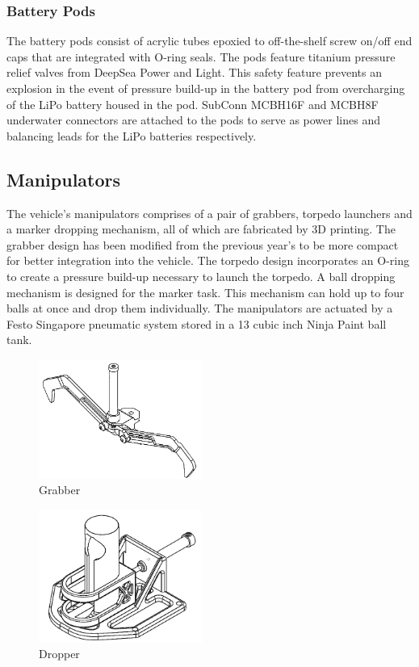 \documentclass[journal,12pt]{IEEEtran}
\begin{document}
\subsubsection{Battery Pods}
The battery pods consist of acrylic tubes epoxied to off-the-shelf screw on/off end caps that are integrated with O-ring seals. The pods feature titanium pressure relief valves from DeepSea Power and Light. This safety feature prevents an explosion in the event of pressure build-up in the battery pod from overcharging of the LiPo battery housed in the pod. SubConn MCBH16F and MCBH8F underwater connectors are attached to the pods to serve as power lines and balancing leads for the LiPo batteries respectively.

\subsection{Manipulators}
The vehicle's manipulators comprises of a pair of grabbers, torpedo launchers and a marker dropping mechanism, all of which are fabricated by 3D printing. The grabber design has been modified from the previous year's to be more compact for better integration into the vehicle. The torpedo design incorporates an O-ring to create a pressure build-up necessary to launch the torpedo. A ball dropping mechanism is designed for the marker task. This mechanism can hold up to four balls at once and drop them individually. The manipulators are actuated by a Festo Singapore pneumatic system stored in a 13 cubic inch Ninja Paint ball tank.

\begin{figure}[h]
\centering
\includegraphics[width=2.1in]{Grabber.png}
\caption{Grabber}
\end{figure}

\begin{figure}[h]
\centering
\includegraphics[width=2.1in]{Dropper.png}
\caption{Dropper}
\end{figure}
\end{document}
